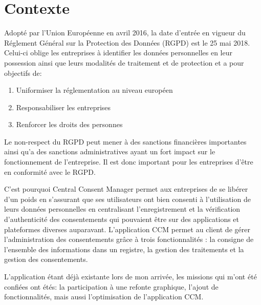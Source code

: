 \documentclass[12pt, a4paper]{report}
\newcommand\tab[1][1cm]{\hspace*{#1}}
\begin{document}
\section{Contexte}
\tab{} Adopté par l’Union Européenne en avril 2016, la date d’entrée en vigueur du Réglement Général sur la Protection des Données (RGPD) est le 25 mai 2018. Celui-ci oblige les entreprises à identifier les données personnelles en leur possession ainsi que leurs modalités de traitement et de protection et a pour objectifs de\@:
\begin{enumerate}
    \item Uniformiser la réglementation au niveau européen
    \item Responsabiliser les entreprises
    \item Renforcer les droits des personnes
\end{enumerate}
\tab{} Le non-respect du RGPD peut mener à des sanctions financières importantes ainsi qu'a des sanctions administratives ayant un fort impact sur le fonctionnement de l'entreprise.
Il est donc important pour les entreprises d'être en conformité avec le RGPD.\newline

C'est pourquoi Central Consent Manager permet aux entreprises de se libérer d’un poids en s’assurant que ses utilisateurs ont bien consenti à l’utilisation de leurs données personnelles en centralisant l’enregistrement et la vérification d’authenticité des consentements qui pouvaient être sur des applications et plateformes diverses auparavant.
L’application CCM permet au client de gérer l’administration des consentements grâce à trois fonctionnalités : la consigne de l’ensemble des informations dans un registre, la gestion des traitements et la gestion des consentements.\newline

L'application étant déjà existante lors de mon arrivée, les missions qui m'ont été confiées ont étés: la participation à une refonte graphique, l'ajout de fonctionnalités, mais aussi l'optimisation de l'application CCM.
\end{document}
